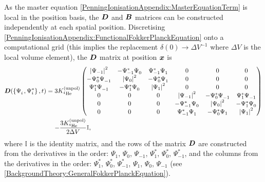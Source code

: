 As the master equation \eqref{PenningIonisationAppendix:MasterEquationTerm} is local in the position basis, the $\bm{D}$ and $\bm{B}$ matrices can be constructed independently at each spatial position. Discretising \eqref{PenningIonisationAppendix:FunctionalFokkerPlanckEquation} onto a computational grid (this implies the replacement $\delta(0) \rightarrow \Delta V^{-1}$ where $\Delta V$ is the local volume element), the $\bm{D}$ matrix at position $\bm{x}$ is
\begin{align}
    \begin{split}
        \vect{D}(\left\{ \Psi_i^{\phantom{*}}, \Psi_i^* \right\}, t) &= 3 \Kunpol
        \begin{pmatrix}
            \abs{\Psi_{-1}}^2 & - \Psi_{-1}^* \Psi_0^{\phantom{*}} & \Psi_{-1}^* \Psi_{1}^{\phantom{*}} & 0 & 0 & 0 \\
            - \Psi_{0}^* \Psi_{-1}^{\phantom{*}} & \abs{\Psi_{0}}^2 & - \Psi_{0}^*\Psi_1^{\phantom{*}} & 0 & 0 & 0 \\
            \Psi_{1}^* \Psi_{-1}^{\phantom{*}} & - \Psi_{1}^* \Psi_0^{\phantom{*}} & \abs{\Psi_{1}}^2  & 0 & 0 & 0 \\
            0 & 0 & 0 & \abs{\Psi_{-1}}^2 & - \Psi_{0}^* \Psi_{-1}^{\phantom{*}} & \Psi_{1}^* \Psi_{-1}^{\phantom{*}} \\
            0 & 0 & 0 & - \Psi_{-1}^* \Psi_0^{\phantom{*}} & \abs{\Psi_{0}}^2 & - \Psi_{1}^* \Psi_0^{\phantom{*}} \\
            0 & 0 & 0 & \Psi_{-1}^* \Psi_{1}^{\phantom{*}} & - \Psi_0^* \Psi_1 & \abs{\Psi_1}^2
        \end{pmatrix}\\
        &\relphantom{=}- \frac{3 \Kunpol}{2 \Delta V} \mathbb{I},
    \end{split}
    \label{PenningIonisationAppendix:DMatrix}
\end{align}
where $\mathbb{I}$ is the identity matrix, and the rows of the matrix $\bm{D}$ are constructed from the derivatives in the order: $\Psi_1^{\phantom{*}}$, $\Psi_0^{\phantom{*}}$, $\Psi_{-1}^{\phantom{*}}$, $\Psi_1^*$, $\Psi_0^*$, $\Psi_{-1}^*$, and the columns from the derivatives in the order: $\Psi_1^*$, $\Psi_0^*$, $\Psi_{-1}^*$, $\Psi_1^{\phantom{*}}$, $\Psi_0^{\phantom{*}}$, $\Psi_{-1}^{\phantom{*}}$ (see \eqref{BackgroundTheory:GeneralFokkerPlanckEquation}).

